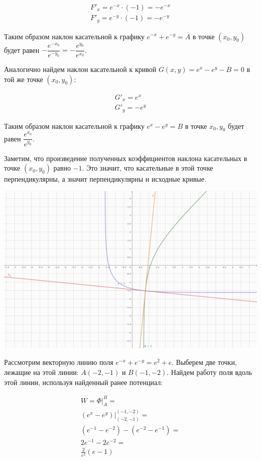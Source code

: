 \begin{equation*}\begin{split}
    F'_x = e^{-x} \cdot (-1) = -e^{-x} \\
    F'_y = e^{-y} \cdot (-1) = -e^{-y}
  \end{split}\end{equation*}

Таким образом наклон касательной к графику \(e^{-x} + e^{-y} = A\) в точке
\((x_0, y_0)\) будет равен
\(-\dfrac{e^{-x_0}}{e^{-y_0}} = -\dfrac{e^{y_0}}{e^{x_0}}\).

Аналогично найдем наклон касательной к кривой \(G(x, y) = e^x - e^y - B = 0\) в
той же точке \((x_0, y_0)\):

\begin{equation*}\begin{split}
    G'_x = e^x \\
    G'_y = -e^y
  \end{split}\end{equation*}

Таким образом наклон касательной к графику \(e^x - e^y = B\) в точке
\(x_0, y_0\) будет равен \(\dfrac{e^{x_0}}{e^{y_0}}\).

Заметим, что произведение полученных коэффициентов наклона касательных в точке
\((x_0, y_0)\) равно \(-1\). Это значит, что касательные в этой точке
перпендикулярны, а значит перпендикулярны и исходные кривые.

\includegraphics[width=\textwidth]{images/t02_p03.png}

\bigskip

Рассмотрим векторную линию поля \(e^{-x} + e^{-y} = e^2 + e\). Выберем две
точки, лежащие на этой линии: \(A(-2, -1)\) и \(B(-1, -2)\). Найдем работу поля
вдоль этой линии, используя найденный ранее потенциал:

\begin{equation*}\begin{split}
    W = \Phi \bigg\vert_A^B = \\
    (e^x - e^y) \bigg\vert_{(-2, -1)}^{(-1, -2)} = \\
    (e^{-1} - e^{-2}) - (e^{-2} - e^{-1}) = \\
    2e^{-1} - 2e^{-2} = \\
    \frac{2}{e^2}(e - 1)
  \end{split}\end{equation*}